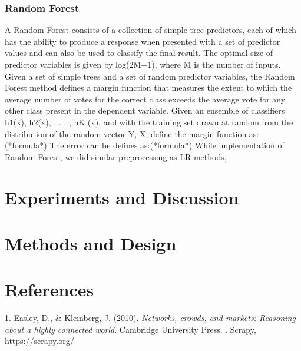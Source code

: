 \documentclass[12pt]{report}
\begin{document}
\subsubsection*{Random Forest}
A Random Forest consists of a collection of simple tree predictors, each of which has the ability to produce a response when presented with a set of predictor values and  can also be used to classify the final result. The optimal size of predictor variables is given by log(2M+1), where M is the number of inputs. 
\newline
\newline
Given a set of simple trees and a set of random predictor variables, the Random Forest method defines a margin function that measures the extent to which the average number of votes for the correct class exceeds the average vote for any other class present in the dependent variable.
Given an ensemble of classifiers h1(x), h2(x), . . . , hK (x), and with the training set drawn at random from the distribution of the random vector Y, X, define the margin function as:
\newline (*formula*)
\newline The error can be defines as:(*formula*)
\newline
\newline
While implementation of Random Forest, we did similar preprocessing as LR methods, 


\section*{Experiments and Discussion}

\section*{Methods and Design}






\newpage



\newpage
\section*{References}

1. Easley, D., \& Kleinberg, J. (2010). \textit{Networks, crowds, and markets: Reasoning about a highly connected world}. Cambridge University Press.
\newline
{}. Scrapy, \href{Scrapy website}{https://scrapy.org/}
\newline
\newline
\end{document}
